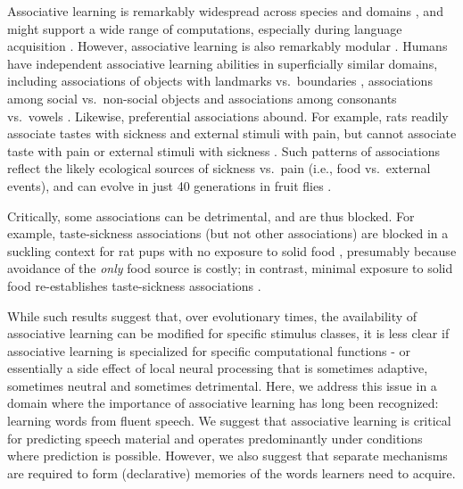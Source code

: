 \documentclass[]{article}
\begin{document}


Associative learning is remarkably widespread across species and domains \citep{ Saffran-Science,Aslin1998,Hauser2001,Kirkham2002,Toro2005-backward,Turk-Browne-reversal, Chen2015}, and might support a wide range of computations, especially during language acquisition \citep{Aslin2012, Seidenberg2002}. However, associative learning is also remarkably modular \citep{Endress-duplications}. Humans have independent associative learning abilities in superficially similar domains, including associations of objects with landmarks vs.~boundaries \citep{Doeller2008}, associations among social vs.~non-social objects \citep{Tompson2019} and associations among consonants vs.~vowels \citep{Bonatti2005,Toro2008}. Likewise, preferential associations abound. For example, rats readily associate tastes with sickness and external stimuli with pain, but cannot associate taste with pain or external stimuli with sickness \citep{Garcia1974}. Such patterns of associations reflect the likely ecological sources of sickness vs.~pain (i.e., food vs.~external events), and can evolve in just 40 generations in fruit flies \citep{Dunlap2014}.

Critically, some associations can be detrimental, and are thus blocked. For example, taste-sickness associations (but not other associations) are blocked in a suckling context for rat pups with no exposure to solid food \citep{Martin1979, Alberts1984}, presumably because avoidance of the \emph{only} food source is costly; in contrast, minimal exposure to solid food re-establishes taste-sickness associations \citep{Gubernick1984}.

While such results suggest that, over evolutionary times, the availability of associative learning can be modified for specific stimulus classes, it is less clear if associative learning is specialized for specific computational functions - or essentially a side effect of local neural processing \citep[a ``spandrel'' in biological terms;][]{Gould1979} that is sometimes adaptive, sometimes neutral and sometimes detrimental. Here, we address this issue in a domain where the importance of associative learning has long been recognized: learning words from fluent speech. We suggest that associative learning is critical for predicting speech material and operates predominantly under conditions where prediction is possible. However, we also suggest that separate mechanisms are required to form (declarative) memories of the words learners need to acquire.
\end{document}
